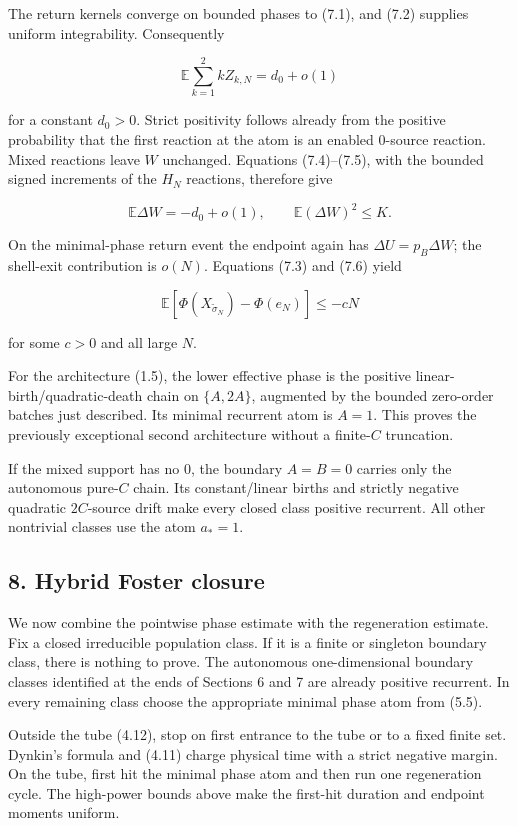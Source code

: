 The return kernels converge on bounded phases to (7.1), and (7.2)
supplies uniform integrability. Consequently

\[
 \mathbb E\sum_{k=1}^2 kZ_{k,N}=d_0+o(1)
\tag{7.5}
\]

for a constant \(d_0>0\). Strict positivity follows already from the
positive probability that the first reaction at the atom is an enabled
\(0\)-source reaction. Mixed reactions leave \(W\) unchanged. Equations
(7.4)--(7.5), with the bounded signed increments of the \(H_N\)
reactions, therefore give

\[
 \mathbb E\Delta W=-d_0+o(1),\qquad
 \mathbb E(\Delta W)^2\le K.
\tag{7.6}
\]

On the minimal-phase return event the endpoint again has
\(\Delta U=p_B\Delta W\); the shell-exit contribution is \(o(N)\).
Equations (7.3) and (7.6) yield

\[
 \mathbb E[\Phi(X_{\widetilde\sigma_N})-\Phi(e_N)]
 \le-cN
\tag{7.7}
\]

for some \(c>0\) and all large \(N\).

For the architecture (1.5), the lower effective phase is the positive
linear-birth/quadratic-death chain on \(\{A,2A\}\), augmented by the
bounded zero-order batches just described. Its minimal recurrent atom is
\(A=1\). This proves the previously exceptional second architecture
without a finite-\(C\) truncation.

If the mixed support has no \(0\), the boundary \(A=B=0\) carries only
the autonomous pure-\(C\) chain. Its constant/linear births and strictly
negative quadratic \(2C\)-source drift make every closed class positive
recurrent. All other nontrivial classes use the atom \(a_*=1\).

\subsection{8. Hybrid Foster closure}

We now combine the pointwise phase estimate with the regeneration
estimate. Fix a closed irreducible population class. If it is a finite
or singleton boundary class, there is nothing to prove. The autonomous
one-dimensional boundary classes identified at the ends of Sections 6
and 7 are already positive recurrent. In every remaining class choose
the appropriate minimal phase atom from (5.5).

Outside the tube (4.12), stop on first entrance to the tube or to a
fixed finite set. Dynkin's formula and (4.11) charge physical time with
a strict negative margin. On the tube, first hit the minimal phase atom
and then run one regeneration cycle. The high-power bounds above make
the first-hit duration and endpoint moments uniform.

